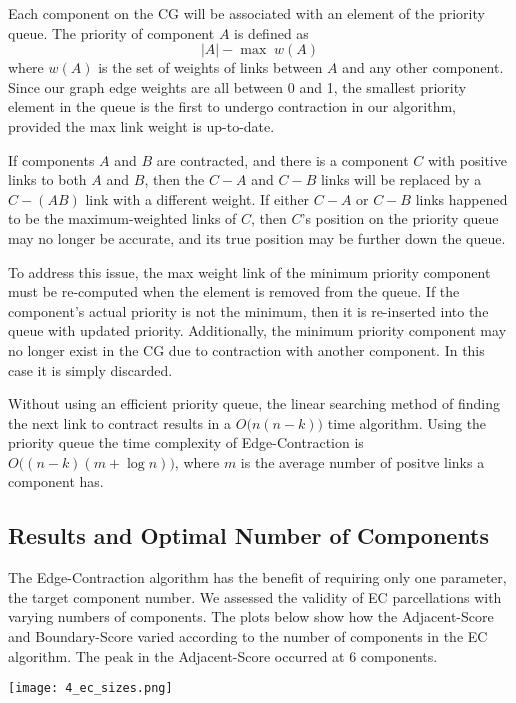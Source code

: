 Each component on the CG will be associated with an element of the
priority queue. The priority of component $A$ is defined as
\[ |A| - \max\;w(A) \]
where $w(A)$ is the set of weights of links between $A$ and any other
component. Since our graph edge weights are all between 0 and 1,
the smallest priority element in the queue is the first to undergo
contraction in our algorithm, provided the max link weight is up-to-date.

If components $A$ and $B$ are contracted, and there is a component $C$
with positive links to both $A$ and $B$, then the $C-A$ and $C-B$ links
will be replaced by a $C-(AB)$ link with a different weight. If either
$C-A$ or $C-B$ links happened to be the maximum-weighted links of $C$,
then $C$'s position on the priority queue may no longer be accurate, and
its true position may be further down the queue.

To address this issue, the max weight link of the minimum priority
component must be re-computed when the element is removed from the queue.
If the component's actual priority is not the minimum, then it is
re-inserted into the queue with updated priority.
Additionally, the minimum priority component may no longer exist in the
CG due to contraction with another component. In this case it is simply
discarded.

Without using an efficient priority queue, the linear searching method
of finding the next link to contract results in a $O\big(n (n-k)\big)$
time algorithm. Using the priority queue the time complexity of
Edge-Contraction is $O \big((n - k) (m + \log n)\big)$, where $m$ is
the average number of positve links a component has.

\subsection{Results and Optimal Number of Components}

The Edge-Contraction algorithm has the benefit of requiring only one
parameter, the target component number. We assessed the validity of EC
parcellations with varying numbers of components. The plots below show
how the Adjacent-Score and Boundary-Score varied according to the
number of components in the EC algorithm. The peak in the Adjacent-Score
occurred at 6 components.

\texttt{[image: 4\_ec\_sizes.png]}

\begin{center}

\end{center}